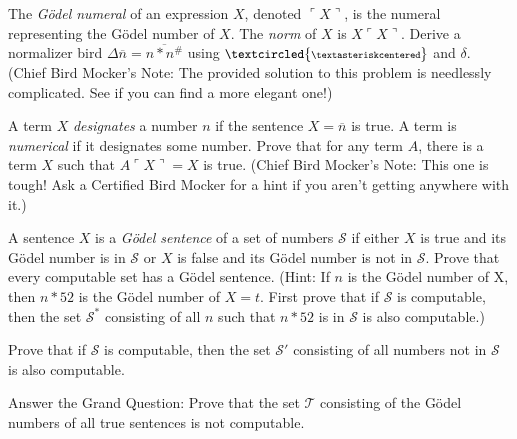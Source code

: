 \documentclass[12pt, letterpaper]{article}
\begin{document}
\begin{prob}{25.2}
The \emph{G\"{o}del numeral} of an expression $X$, denoted $\ulcorner X \urcorner$, is the numeral representing the G\"{o}del number of $X$. The \emph{norm} of $X$ is $X\ulcorner X \urcorner$. Derive a normalizer bird $\Delta \overline{n} = \overline{n \ast n^\#}$ using $\small \textcircled{\scriptsize \textasteriskcentered}$ and $\delta$. (Chief Bird Mocker's Note: The provided solution to this problem is needlessly complicated. See if you can find a more elegant one!)
\end{prob}

\begin{prob}{25.3}
A term $X$ \emph{designates} a number $n$ if the sentence $X = \overline{n}$ is true. A term is \emph{numerical} if it designates some number. Prove that for any term $A$, there is a term $X$ such that $A\ulcorner X \urcorner = X$ is true. (Chief Bird Mocker's Note: This one is tough! Ask a Certified Bird Mocker for a hint if you aren't getting anywhere with it.)
\end{prob}

\begin{prob}{25.4}
A sentence $X$ is a \emph{G\"{o}del sentence} of a set of numbers $\mathcal{S}$ if either $X$ is true and its G\"{o}del number is in $\mathcal{S}$ or $X$ is false and its G\"{o}del number is not in $\mathcal{S}$. Prove that every computable set has a G\"{o}del sentence. (Hint: If $n$ is the G\"{o}del number of X, then $n \ast 52$ is the G\"{o}del number of $X = t$. First prove that if $\mathcal{S}$ is computable, then the set $\mathcal{S}^*$ consisting of all $n$ such that $n \ast 52$ is in $\mathcal{S}$ is also computable.)
\end{prob}

\begin{prob}{25.5}
Prove that if $\mathcal{S}$ is computable, then the set $\mathcal{S}'$ consisting of all numbers not in $\mathcal{S}$ is also computable.
\end{prob}

\begin{prob}{25.5}
Answer the Grand Question: Prove that the set $\mathcal{T}$ consisting of the  G\"{o}del numbers of all true sentences is not computable.
\end{prob}
\end{document}
